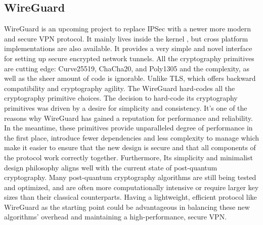 \subsection{WireGuard}
WireGuard is an upcoming project to replace IPSec with a newer more modern and secure VPN protocol. It mainly lives inside the kernel , but cross platform implementations are also available. It provides a very simple and novel interface for setting up secure encrypted network tunnels. All the cryptography primitives are cutting edge: Curve25519, ChaCha20, and Poly1305 and the complexity, as well as the sheer amount of code is ignorable. Unlike TLS, which offers backward compatibility and cryptography agility. The WireGuard hard-codes all the cryptography primitive choices. The decision to hard-code its cryptography primitives was driven by a desire for simplicity and consistency. It's one of the reasons why WireGuard has gained a reputation for performance and reliability. In the meantime, these primitives provide unparalleled degree of performance in the first place, introduce fewer dependencies and less complexity to manage which make it easier to ensure that the new design is secure and that all components of the protocol work correctly together. Furthermore, Its simplicity and minimalist design philosophy aligns well with the current state of post-quantum cryptography. Many post-quantum cryptography algorithms are still being tested and optimized, and are often more computationally intensive or require larger key sizes than their classical counterparts. Having a lightweight, efficient protocol like WireGuard as the starting point could be advantageous in balancing these new algorithms' overhead and maintaining a high-performance, secure VPN. 

